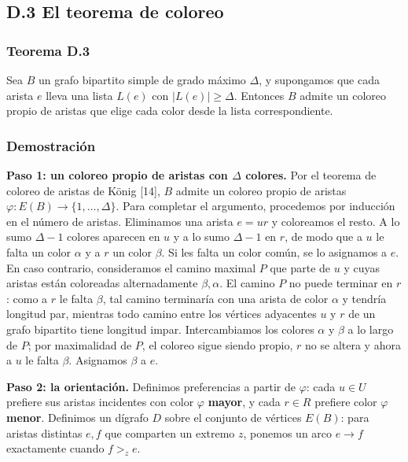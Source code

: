 \documentclass[
  11pt,
]{article}
\begin{document}
\subsection{D.3 El teorema de coloreo}\label{d.3-el-teorema-de-coloreo}

\subsubsection{Teorema D.3}\label{teorema-d.3-galvin-caso-de-grado-muxe1ximo}

Sea \(B\) un grafo bipartito simple de grado máximo \(\Delta\), y
supongamos que cada arista \(e\) lleva una lista \(L(e)\) con
\(|L(e)|\ge\Delta\). Entonces \(B\) admite un coloreo propio de aristas
que elige cada color desde la lista correspondiente.

\subsubsection{Demostración}\label{demostraciuxf3n-9}

\textbf{Paso 1: un coloreo propio de aristas con \(\Delta\) colores.}
Por el teorema de coloreo de aristas de König {[}14{]}, \(B\) admite un
coloreo propio de aristas \(\varphi:E(B)\to\{1,\ldots,\Delta\}\). Para
completar el argumento, procedemos por inducción en el número de
aristas. Eliminamos una arista \(e=ur\) y coloreamos el resto. A lo sumo
\(\Delta-1\) colores aparecen en \(u\) y a lo sumo \(\Delta-1\) en
\(r\), de modo que a \(u\) le falta un color \(\alpha\) y a \(r\) un
color \(\beta\). Si les falta un color común, se lo asignamos a \(e\).
En caso contrario, consideramos el camino maximal \(P\) que parte de
\(u\) y cuyas aristas están coloreadas alternadamente \(\beta,\alpha\).
El camino \(P\) no puede terminar en \(r\): como a \(r\) le falta
\(\beta\), tal camino terminaría con una arista de color \(\alpha\) y
tendría longitud par, mientras todo camino entre los vértices adyacentes
\(u\) y \(r\) de un grafo bipartito tiene longitud impar. Intercambiamos
los colores \(\alpha\) y \(\beta\) a lo largo de \(P\); por maximalidad
de \(P\), el coloreo sigue siendo propio, \(r\) no se altera y ahora a
\(u\) le falta \(\beta\). Asignamos \(\beta\) a \(e\).

\textbf{Paso 2: la orientación.} Definimos preferencias a partir de
\(\varphi\): cada \(u\in U\) prefiere sus aristas incidentes con color
\(\varphi\) \textbf{mayor}, y cada \(r\in R\) prefiere color \(\varphi\)
\textbf{menor}. Definimos un dígrafo \(D\) sobre el conjunto de vértices
\(E(B)\): para aristas distintas \(e,f\) que comparten un extremo \(z\),
ponemos un arco \(e\to f\) exactamente cuando \(f>_ze\).
\end{document}
